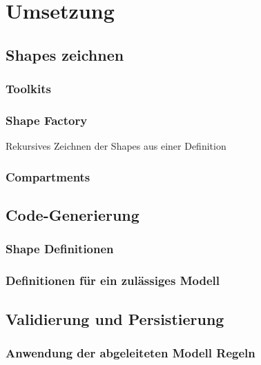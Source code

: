 \section{Umsetzung}


\subsection{Shapes zeichnen}

\subsubsection{Toolkits}

\subsubsection{\dd}

\citep{dd}

\subsubsection{Shape Factory}

Rekursives Zeichnen der Shapes aus einer Definition

\subsubsection{Compartments}


\subsection{Code-Generierung}

\subsubsection{Shape Definitionen}

\subsubsection{Definitionen für ein zulässiges Modell}


\subsection{Validierung und Persistierung}

\subsubsection{Anwendung der abgeleiteten Modell Regeln}

